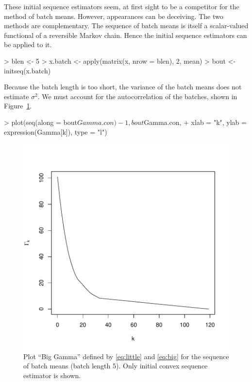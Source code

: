 \documentclass[12pt]{article}
\begin{document}
These initial sequence estimators seem, at first sight to be a competitor
for the method of batch means.  However, appearances can be deceiving.
The two methods are complementary.  The sequence of batch means is itself
a scalar-valued functional of a reversible Markov chain.  Hence the
initial sequence estimators can be applied to it.
\begin{Schunk}
\begin{Sinput}
> blen <- 5
> x.batch <- apply(matrix(x, nrow = blen), 2, mean)
> bout <- initseq(x.batch)
\end{Sinput}
\end{Schunk}
Because the batch length is too short, the variance of the batch means
does not estimate $\sigma^2$.  We must account for the autocorrelation
of the batches, shown in Figure~\ref{fig:gambat}.
\begin{Schunk}
\begin{Sinput}
> plot(seq(along = bout$Gamma.con) - 1, bout$Gamma.con,
+      xlab = "k", ylab = expression(Gamma[k]), type = "l")
\end{Sinput}
\end{Schunk}
\begin{figure}
\begin{center}
\includegraphics{sweaveTemplate-figgambat}
\end{center}
\caption{Plot ``Big Gamma'' defined by \eqref{eq:little} and \eqref{eq:big}
         for the sequence of batch means (batch length 5).
         Only initial convex sequence estimator is shown.}
\label{fig:gambat}
\end{figure}
\end{document}
